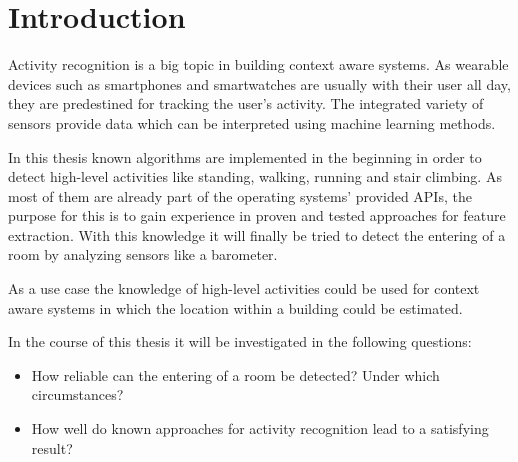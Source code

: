 \chapter{Introduction}
\label{cha:Introduction}

Activity recognition is a big topic in building context aware systems. As wearable devices such as smartphones and smartwatches are usually with their user all day, they are predestined for tracking the user's activity. The integrated variety of sensors provide data which can be interpreted using machine learning methods. 

In this thesis known algorithms are implemented in the beginning in order to detect high-level activities like standing, walking, running and stair climbing. As most of them are already part of the operating systems' provided APIs, the purpose for this is to gain experience in proven and tested approaches for feature extraction. With this knowledge it will finally be tried to detect the entering of a room by analyzing sensors like a barometer. 

As a use case the knowledge of high-level activities could be used for context aware systems in which the location within a building could be estimated. 

In the course of this thesis it will be investigated in the following questions:
\begin{itemize}
\item How reliable can the entering of a room be detected? Under which circumstances?
\item How well do known approaches for activity recognition lead to a satisfying result?
\end{itemize}


